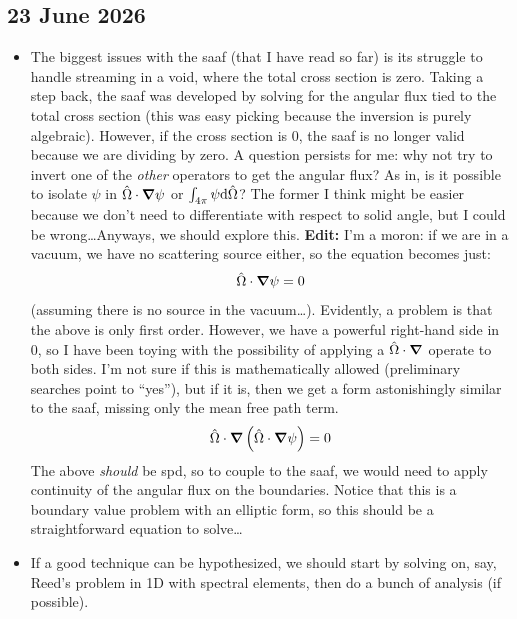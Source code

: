 \subsection*{23 June 2026}
\begin{itemize}
  \item The biggest issues with the \gls{saaf} (that I have read so far) is its struggle to handle streaming in a void, where the total cross section is zero. Taking a step back, the \gls{saaf} was developed by solving for the angular flux tied to the total cross section (this was easy picking because the inversion is purely algebraic). However, if the cross section is 0, the \gls{saaf} is no longer valid because we are dividing by zero. A question persists for me: why not try to invert one of the \emph{other} operators to get the angular flux? As in, is it possible to isolate $\psi$ in $\hat{\Omega} \cdot\grad\psi$ or $\int_{4\pi}\psi\dd\hat{\Omega}$? The former I think might be easier because we don't need to differentiate with respect to solid angle, but I could be wrong\ldots Anyways, we should explore this. \textbf{Edit:} I'm a moron: if we are in a vacuum, we have no scattering source either, so the equation becomes just:
        \begin{equation*}
          \hat{\Omega}\cdot\grad\psi=0
        \end{equation*}
        (assuming there is no source in the vacuum\ldots). Evidently, a problem is that the above is only first order. However, we have a powerful right-hand side in 0, so I have been toying with the possibility of applying a $\hat{\Omega}\cdot\grad$ operate to both sides. I'm not sure if this is mathematically allowed (preliminary searches point to ``yes''), but if it is, then we get a form astonishingly similar to the \gls{saaf}, missing only the mean free path term.
        \begin{equation}\label{eq:2nd-order-vacuum-streaming}
          \hat{\Omega}\cdot\grad\left(\hat{\Omega}\cdot\grad\psi\right)=0
        \end{equation}
        The above \emph{should} be \gls{spd}, so to couple to the \gls{saaf}, we would need to apply continuity of the angular flux on the boundaries. Notice that this is a boundary value problem with an elliptic form, so this should be a straightforward equation to solve\dots
  \item If a good technique can be hypothesized, we should start by solving on, say, Reed's problem in 1D with spectral elements, then do a bunch of analysis (if possible).
\end{itemize}

